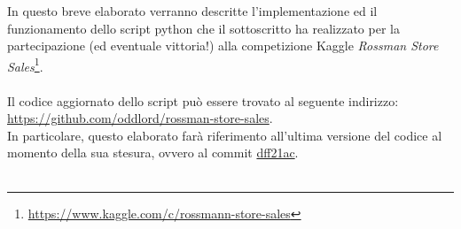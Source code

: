 In questo breve elaborato verranno descritte l'implementazione ed il funzionamento dello script python che il sottoscritto ha realizzato per la partecipazione (ed eventuale vittoria!) alla competizione Kaggle \textit{Rossman Store Sales}\footnote{\url{https://www.kaggle.com/c/rossmann-store-sales}}.\\
\\
Il codice aggiornato dello script può essere trovato al seguente indirizzo: \url{https://github.com/oddlord/rossman-store-sales}.\\
In particolare, questo elaborato farà riferimento all'ultima versione del codice al momento della sua stesura, ovvero al commit \href{https://github.com/oddlord/rossman-store-sales/tree/dff21aca700b45e7245312fcd4a5c3c3e0615c37}{dff21ac}.\\
\\
